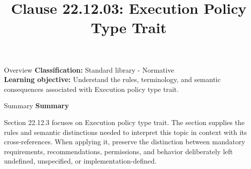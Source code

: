 \documentclass[10pt,letterpaper]{article}
\title{Clause 22.12.03: Execution Policy Type Trait}
\author{}
\date{}
\begin{document}
\maketitle
\begin{CornellOverviewBox}{Overview}
\textbf{Classification:} Standard library - Normative\\[2pt]
\textbf{Learning objective:} Understand the rules, terminology, and semantic consequences associated with Execution policy type trait.
\end{CornellOverviewBox}\begin{CornellSummaryBox}{Summary}
{\sffamily\bfseries\color{Accent} Summary}\par\vspace{3pt}Section 22.12.3 focuses on Execution policy type trait. The section supplies the rules and semantic distinctions needed to interpret this topic in context with its cross-references. When applying it, preserve the distinction between mandatory requirements, recommendations, permissions, and behavior deliberately left undefined, unspecified, or implementation-defined.
\end{CornellSummaryBox}
\end{document}

